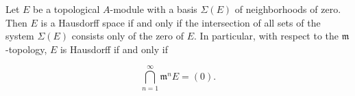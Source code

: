 Let $E$ be a topological $A$-module with a basis $\Sigma(E)$ of neighborhoods of zero. Then $E$ is a Hausdorff space if and only if the intersection of all sets of the system $\Sigma(E)$ consists only of the zero of $E$. In particular, with respect to the $\mathfrak{m}$-topology, $E$ is Hausdorff if and only if

$$\bigcap_{n=1}^{\infty} \mathfrak{m}^n E = (0).$$